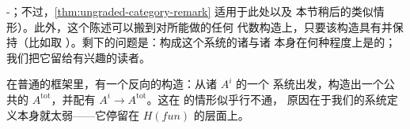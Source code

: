 \trAinfty-\trCategory；不过，\cref{thm:ungraded-category-remark} 适用于此处以及%
本节稍后的类似情形）。此外，这个陈述可以搬到对\trFukayaCategory{}所能做的任何%
代数构造上，只要该构造具有\trFunctoriality{}并保持\trQuasiequivalence{}（比如取%
\trDerivedCategory）。剩下的问题是：构成这个\trCoherent{}系统的诸\trFunctor{}与诸%
\trNaturalTransformation{}本身在何种程度上是\trCanonical{}的；我们把它留给有兴趣的读者。
\begin{remark}\label{thm:converse-construction-remark}
在普通\trCategory{}的框架里，有一个反向的构造：从诸\trCategory{} $A^i$ 的一个%
\trCoherent{}系统出发，构造出一个公共的\trCategory{} $A^{\mathrm{tot}}$，并配有%
\trEquivalence{} $A^i\to A^{\mathrm{tot}}$。这在 \trAinfty{}的情形似乎行不通，%
原因在于我们的\trCoherent{}系统定义本身就太弱——它停留在\trCohomology\trFunctor\trCategory{}
$H(\mathit{fun})$ 的层面上。
\end{remark}
